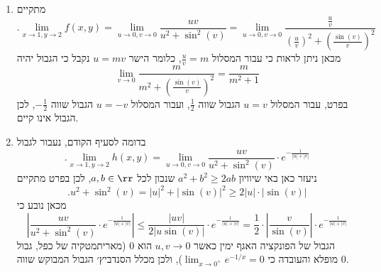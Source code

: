 \documentclass[12pt, a4paper]{article}
\begin{document}
\begin{enumerate}
\begin{enumerate}
\item 
מתקיים
$$.\underset{x\to 1,y\to 2}{\lim}f(x,y)=
\underset{u\to 0,v\to 0}{\lim}
\frac{uv}{u^2+\sin^2(v)}
=\underset{u\to 0,v\to 0}{\lim}
\frac{\frac{u}{v}}{\left(\frac{u}{v}\right)^2+\left(\frac{\sin(v)}{v}\right)^2}
$$
מכאן ניתן לראות כי עבור המסלול
$\frac{u}{v}=m$,
כלומר הישר
$u=mv$
נקבל כי הגבול יהיה
$$\underset{v\to 0}{\lim}
\frac{m}{m^2+\left(\frac{\sin(v)}{v}\right)^2}=\frac{m}{m^2+1}
$$
בפרט, עבור המסלול
$u=v$
הגבול שווה
$\frac{1}{2}$,
ועבור המסלול
$u=-v$
הגבול שווה
$-\frac{1}{2}$,
לכן הגבול אינו קיים.
\\
\item 
בדומה לסעיף הקודם, נעבור לגבול
$$.\underset{x\to 1,y\to 2}{\lim}h(x,y)=
\underset{u\to 0,v\to 0}{\lim}
\frac{uv}{u^2+\sin^2(v)}\cdot
e^{-\frac{1}{|u|+|v|}}$$ 
ניעזר כאן באי שיוויון
$a^2+b^2\ge 2ab$
שנכון לכל
$a,b\in\rr$,
לכן בפרט מתקיים
$$.u^2+\sin^2(v)=|u|^2+|\sin(v)|^2\ge 2|u|\cdot |\sin(v)|$$
מכאן נובע כי
$$\left|\frac{uv}{u^2+\sin^2(v)}\cdot
e^{-\frac{1}{|u|+|v|}}\right|
\le
\frac{|uv|}{2|u\sin(v)|}\cdot
e^{-\frac{1}{|u|+|v|}}
=\frac{1}{2}\cdot\left|
\frac{v}{\sin(v)}\right|\cdot
e^{-\frac{1}{|u|+|v|}}
$$
הגבול של הפונקציה האגף ימין כאשר
$u,v\to0$
הוא 
$0$
(מאריתמטקיה של כפל, גבול מופלא והעובדה כי
$\lim_{x\to 0^+}e^{-1/x}=0$),
ולכן מכלל הסנדביץ׳ הגבול המבוקש שווה
$0$.
\end{enumerate}



\end{enumerate}
\end{document}
